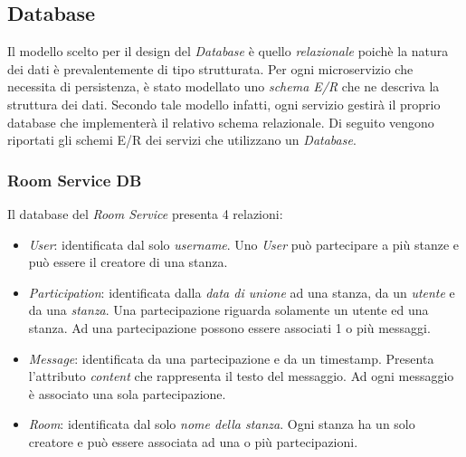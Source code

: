 \subsection{Database}
Il modello scelto per il design del \textit{Database} è quello \textit{relazionale} poichè la natura dei dati è prevalentemente di tipo strutturata.
Per ogni microservizio che necessita di persistenza, è stato modellato uno \textit{schema E/R} che ne descriva la struttura dei dati. Secondo tale modello infatti, ogni servizio gestirà il proprio database che implementerà il relativo schema relazionale.
Di seguito vengono riportati gli schemi E/R dei servizi che utilizzano un \textit{Database}.

\subsubsection{Room Service DB}
Il database del \textit{Room Service} presenta 4 relazioni: 
\begin{itemize}
    \item \textit{User}: identificata dal solo \textit{username}. Uno \textit{User} può partecipare a più stanze e può essere il creatore di una stanza.
    \item \textit{Participation}: identificata dalla \textit{data di unione} ad una stanza, da un \textit{utente} e da una \textit{stanza}. Una partecipazione riguarda solamente un utente ed una stanza. Ad una partecipazione possono essere associati 1 o più messaggi.
    \item \textit{Message}: identificata da una partecipazione e da un timestamp. Presenta l'attributo \textit{content} che rappresenta il testo del messaggio. Ad ogni messaggio è associato una sola partecipazione.
    \item \textit{Room}: identificata dal solo \textit{nome della stanza}. Ogni stanza ha un solo creatore e può essere associata ad una o più partecipazioni.
\end{itemize}


